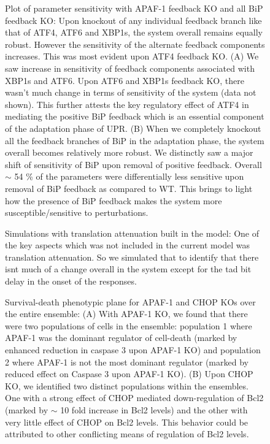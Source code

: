 \begin{figure}\centering
	\caption{Plot of parameter sensitivity with APAF-1 feedback KO and all BiP feedback KO: Upon knockout of any individual feedback branch like that of ATF4, ATF6 and XBP1s, the system overall remains equally robust. However the sensitivity of the alternate feedback components increases. This was most evident upon ATF4 feedback KO. 
	(A) We saw increase in sensitivity of feedback components associated with XBP1s and ATF6. Upon ATF6 and XBP1s feedback KO, there wasn't much change in terms of sensitivity of the system (data not shown). This further attests the key regulatory effect of ATF4 in mediating the positive BiP feedback which is an essential component of the adaptation phase of UPR. 
	(B) When we completely knockout all the feedback branches of BiP in the adaptation phase, the system overall becomes relatively more robust. We distinctly saw a major shift of sensitivity of BiP upon removal of positive feedback. Overall $\sim$ 54 \% of the parameters were differentially less sensitive upon removal of BiP feedback as compared to WT. This brings to light how the presence of BiP feedback makes the system more susceptible/sensitive to perturbations.}
	\label{fg:Sens_S3}
\end{figure}


\begin{figure}\centering
	\caption{Simulations with translation attenuation built in the model: One of the key aspects which was not included in the current model was translation attenuation. So we simulated that to identify that there isnt much of a change overall in the system except for the tad bit delay in the onset of the responses. }
	\label{fg:Trans_S1}
\end{figure}

\begin{figure}\centering
	\caption{Survival-death phenotypic plane for APAF-1 and CHOP KOs over the entire ensemble: (A) With APAF-1 KO, we found that there were two populations of cells in the ensemble: population 1 where APAF-1 was the dominant regulator of cell-death (marked by enhanced reduction in caspase 3 upon APAF-1 KO) and population 2 where APAF-1 is not the most dominant regulator (marked by reduced effect on Caspase 3 upon APAF-1 KO). (B) Upon CHOP KO, we identified two distinct populations within the ensembles. One with a strong effect of CHOP mediated down-regulation of Bcl2 (marked by $\sim$ 10 fold increase in Bcl2 levels) and the other with very little effect of CHOP on Bcl2 levels. This behavior could be attributed to other conflicting means of regulation of Bcl2 levels.}
	\label{fg:COUP_S1}
\end{figure}

